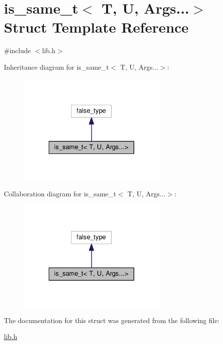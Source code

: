 \hypertarget{structis__same__t_3_01T_00_01U_00_01Args_8_8_8_4}{\section{is\-\_\-same\-\_\-t$<$ T, U, Args...$>$ Struct Template Reference}
\label{structis__same__t_3_01T_00_01U_00_01Args_8_8_8_4}
}


{\ttfamily \#include $<$lib.\-h$>$}



Inheritance diagram for is\-\_\-same\-\_\-t$<$ T, U, Args...$>$\-:
\nopagebreak
\begin{figure}[H]
\begin{center}
\leavevmode
\includegraphics[width=210pt]{structis__same__t_3_01T_00_01U_00_01Args_8_8_8_4__inherit__graph}
\end{center}
\end{figure}


Collaboration diagram for is\-\_\-same\-\_\-t$<$ T, U, Args...$>$\-:
\nopagebreak
\begin{figure}[H]
\begin{center}
\leavevmode
\includegraphics[width=210pt]{structis__same__t_3_01T_00_01U_00_01Args_8_8_8_4__coll__graph}
\end{center}
\end{figure}


The documentation for this struct was generated from the following file\-:\begin{DoxyCompactItemize}
\item 
\hyperlink{lib_8h}{lib.\-h}\end{DoxyCompactItemize}
